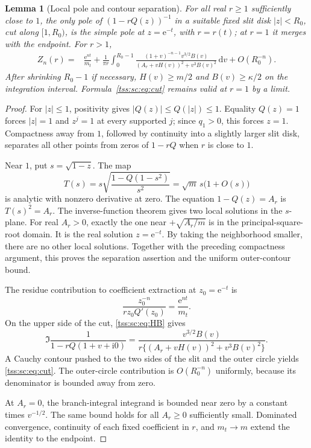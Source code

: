 \documentclass[11pt]{article}
\newtheorem{lemma}[theorem]{Lemma}
\theoremstyle{remark}\newtheorem{remark}[theorem]{Remark}
\theoremstyle{definition}\newtheorem{definition}[theorem]{Definition}
\newcommand{\ii}{\mathrm i}
\newcommand{\dd}{\mathrm d}
\newcommand{\e}{\mathrm e}
\begin{document}
\begin{lemma}[Local pole and contour separation]\label{tss:sc:lem:pole}
For all real $r\geq1$ sufficiently close to $1$, the only pole of $(1-rQ(z))^{-1}$ in a suitable fixed slit disk $|z|<R_0$, cut along $[1,R_0)$, is the simple pole at $z=\e^{-t}$, with $r=r(t)$; at $r=1$ it merges with the endpoint. For $r>1$,
\begin{equation}\label{tss:sc:eq:cut}
\begin{split}
 Z_n(r)={}&\frac{\e^{nt}}{m_t}
 +\frac1{\pi r}\int_0^{R_0-1}
 \frac{(1+v)^{-n-1}v^{3/2}B(v)}
      {(A_r+vH(v))^2+v^3B(v)^2}\,\dd v
 +O(R_0^{-n}).
\end{split}
\end{equation}
After shrinking $R_0-1$ if necessary, $H(v)\geq m/2$ and $B(v)\geq\kappa/2$ on the integration interval. Formula~\eqref{tss:sc:eq:cut} remains valid at $r=1$ by a limit.
\end{lemma}
\begin{proof}
For $|z|\leq1$, positivity gives $|Q(z)|\leq Q(|z|)\leq1$. Equality $Q(z)=1$ forces $|z|=1$ and $z^j=1$ at every supported $j$; since $q_1>0$, this forces $z=1$. Compactness away from $1$, followed by continuity into a slightly larger slit disk, separates all other points from zeros of $1-rQ$ when $r$ is close to $1$.

Near $1$, put $s=\sqrt{1-z}$. The map
\[
 T(s)=s\sqrt{\frac{1-Q(1-s^2)}{s^2}}
      =\sqrt m\,s\bigl(1+O(s)\bigr)
\]
is analytic with nonzero derivative at zero. The equation $1-Q(z)=A_r$ is $T(s)^2=A_r$. The inverse-function theorem gives two local solutions in the $s$-plane. For real $A_r>0$, exactly the one near $+\sqrt{A_r/m}$ is in the principal-square-root domain. It is the real solution $z=\e^{-t}$. By taking the neighborhood smaller, there are no other local solutions. Together with the preceding compactness argument, this proves the separation assertion and the uniform outer-contour bound.

The residue contribution to coefficient extraction at $z_0=\e^{-t}$ is
\[
 \frac{z_0^{-n}}{r z_0Q'(z_0)}=\frac{\e^{nt}}{m_t}.
\]
On the upper side of the cut, \eqref{tss:sc:eq:HB} gives
\[
 \Im\frac1{1-rQ(1+v+\ii0)}
 =\frac{v^{3/2}B(v)}{r\{(A_r+vH(v))^2+v^3B(v)^2\}}.
\]
A Cauchy contour pushed to the two sides of the slit and the outer circle yields \eqref{tss:sc:eq:cut}. The outer-circle contribution is $O(R_0^{-n})$ uniformly, because its denominator is bounded away from zero.

At $A_r=0$, the branch-integral integrand is bounded near zero by a constant times $v^{-1/2}$. The same bound holds for all $A_r\geq0$ sufficiently small. Dominated convergence, continuity of each fixed coefficient in $r$, and $m_t\to m$ extend the identity to the endpoint.
\end{proof}
\end{document}
